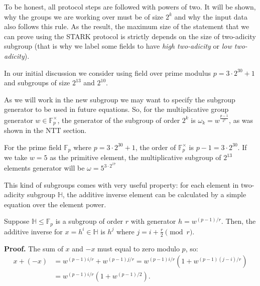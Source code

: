 \documentclass[../lecture-notes.tex]{subfiles}
\begin{document}
To be honest, all protocol steps are followed with powers of two. It will be shown, why the groups we are working over must be of size $2^k$ and why the input data also follows this rule. As the result, the maximum size of the statement that we can prove using the STARK protocol is strictly depends on the size of two-adicity subgroup (that is why we label some fields to have \textit{high two-adicity} or \textit{low two-adicity}).

\begin{remark}
In our initial discussion we consider using field over prime modulus $p = 3\cdot
2^{30} + 1$ and subgroups of size $2^{13}$ and $2^{10}$.
\end{remark}

As we will work in the new subgroup we may want to specify the subgroup
generator to be used in future equations. So, for the multiplicative group
generator $w \in \mathbb{F}_p^{\times}$, the generator of the subgroup of order
$2^k$ is $\omega_k = w^\frac{p - 1}{2^k}$, as was shown in the NTT section.

\begin{example}
For the prime field $\mathbb{F}_p$ where $p = 3\cdot 2^{30} + 1$, the order of $\mathbb{F}^{\times}_p$ is $p-1 = 3\cdot 2^{30}$. If we take $w = 5$ as the primitive element, the multiplicative subgroup of $2^{13}$ elements generator will be $\omega = 5^{3\cdot 2^{17}}$
\end{example}

This kind of subgroups comes with very useful property: for each element in
two-adicity subgroup $\mathbb{H}$, the additive inverse element
can be calculated by a simple equation over the element power.

\begin{proposition}
    Suppose $\mathbb{H} \leq \mathbb{F}_p$ is a subgroup of order $r$ with
    generator $h = w^{(p-1)/r}$. Then, the additive inverse for $x = h^i \in
    \mathbb{H}$ is $h^j$ where $j = i + \frac{r}{2} \pmod{r}$.
\end{proposition}

\textbf{Proof.} The sum of $x$ and $-x$ must equal to zero modulo $p$, so:
\begin{equation*}
    \begin{aligned}
        x + (-x) &= w^{(p-1)i/r} + w^{(p-1)j/r} = w^{(p-1)i/r}(1 + w^{(p-1)(j-i)/r}) \\ &= w^{(p-1)i/r}(1 + w^{(p-1)/2}).
    \end{aligned}
\end{equation*}
\end{document}
